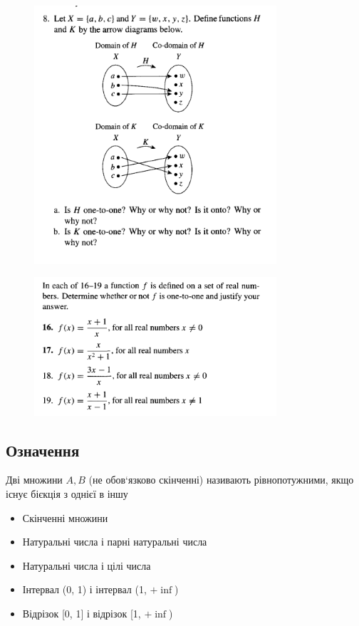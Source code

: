\documentclass{article}
\begin{document}
\begin{figure}
\centering
\includegraphics[width=90mm]{11}
\end{figure}

\begin{figure}
\centering
\includegraphics[width=90mm]{12}
\end{figure}

\pagebreak
\subsection*{Означення}
Дві множини $A,B$ (не обов`язково скінченні) називають рівнопотужними, якщо існує бієкція з однієї в іншу
\begin{itemize}
    \item Скінченні множини
    \item Натуральні числа і парні натуральні числа
    \item Натуральні числа і цілі числа
    \item Інтервал (0, 1) і інтервал (1, $+\inf$)
    \item Відрізок [0, 1] і відрізок [1, $+\inf$)
\end{itemize}
\end{document}
